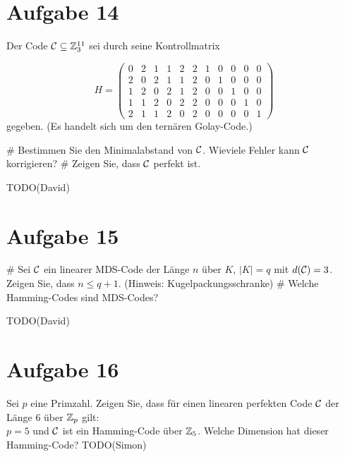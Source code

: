 \section*{Aufgabe 14}
Der Code $\mathcal{C} \subseteq \mathbb{Z}^{11}_3$ sei durch seine Kontrollmatrix

\begin{equation*}
	H =
	\begin{pmatrix}
	0 & 2 & 1 & 1 & 2 & 2 & 1 & 0 & 0 & 0 & 0 \\
	2 & 0 & 2 & 1 & 1 & 2 & 0 & 1 & 0 & 0 & 0 \\
	1 & 2 & 0 & 2 & 1 & 2 & 0 & 0 & 1 & 0 & 0 \\
	1 & 1 & 2 & 0 & 2 & 2 & 0 & 0 & 0 & 1 & 0 \\
	2 & 1 & 1 & 2 & 0 & 2 & 0 & 0 & 0 & 0 & 1
	\end{pmatrix}
\end{equation*}
gegeben.
(Es handelt sich um den ternären Golay-Code.)
\begin{myList}
#
Bestimmen Sie den Minimalabstand von $\mathcal{C}$.
Wieviele Fehler kann $\mathcal{C}$ korrigieren?
#
Zeigen Sie, dass $\mathcal{C}$ perfekt ist.
\end{myList}
TODO(David)

\section*{Aufgabe 15}
\begin{myList}
#
Sei $\mathcal{C}$ ein linearer MDS-Code der Länge $n$ über $K$, $|K| = q$ mit $d(\mathcal{C}) = 3$.
Zeigen Sie, dass $n \leq q + 1$.
(Hinweis: Kugelpackungsschranke)
#
Welche Hamming-Codes sind MDS-Codes?
\end{myList}
TODO(David)

\section*{Aufgabe 16}
Sei $p$ eine Primzahl. Zeigen Sie, dass für einen linearen perfekten Code $\mathcal{C}$ der Länge 6 über $\mathbb{Z}_p$ gilt:\\
$p=5$ und $\mathcal{C}$ ist ein Hamming-Code über $\mathbb{Z}_5$. Welche Dimension hat dieser Hamming-Code?
TODO(Simon)


